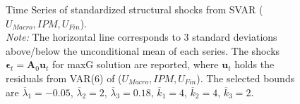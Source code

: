 \documentclass[a4paper,11pt,listof=nochaptergap,oneside,pointednumbers,bibtotoc,bigheadings,liststotoc]{scrbook}
\theoremstyle{mysatz}
\theoremstyle{mydefinition}
\theoremstyle{mybemerkung}
\newcommand{\vect}[1]{\boldsymbol{\mathbf{#1}}}
\begin{document}
\begin{itemize}
\begin{figure}[!h]
   \centering
   \setlength\fboxsep{0pt}
   \setlength\fboxrule{0pt}
      \caption[Time Series of standardized structural shocks from SVAR ($U_{Macro}, IPM, U_{Fin}$).]{Time Series of standardized structural shocks from SVAR ($U_{Macro}, IPM, U_{Fin}$).\\
      \textit{Note:}  The horizontal line corresponds to 3 standard deviations above/below the unconditional mean of each series. The shocks $\vect{\epsilon}_t = \vect{A}_0\vect{u}_t$ for maxG solution are reported, where $\vect{u}_t$ holds the residuals from VAR(6) of ($U_{Macro}, IPM, U_{Fin}$). The selected bounds are $\overline{\lambda}_1 = -0.05$, $\overline{\lambda}_2 = 2$, $\overline{\lambda}_3 = 0.18$, $\overline{k}_1 = 4$, $\overline{k}_2 = 4$, $\overline{k}_3 = 2$.}   \label{fig:ludvigsonetal_timeseries_e_shocks}
\end{figure}




\end{itemize}
\end{document}
